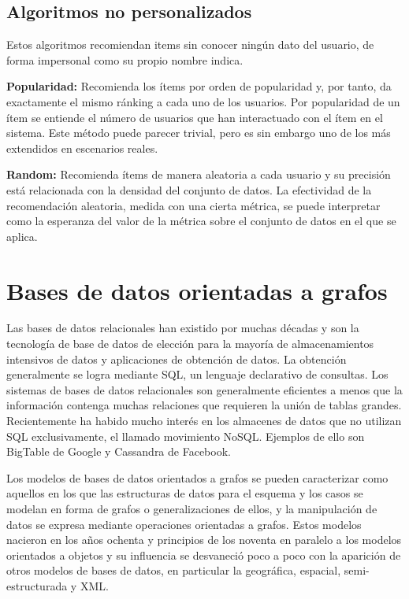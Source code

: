 		\subsection{Algoritmos no personalizados}
		Estos algoritmos recomiendan items sin conocer ningún dato del usuario, de forma impersonal como su propio nombre indica. 

		\textbf{Popularidad:} Recomienda los ítems por orden de popularidad y, por tanto, da exactamente el mismo ránking a cada uno de los usuarios. Por popularidad de un ítem se entiende el número de usuarios que han interactuado con el ítem en el sistema. Este método puede parecer trivial, pero es sin embargo uno de los más extendidos en escenarios reales.

		\textbf{Random:} Recomienda ítems de manera aleatoria a cada usuario y su precisión está relacionada con la densidad del conjunto de datos. La efectividad de la recomendación aleatoria, medida con una cierta métrica, se puede interpretar como la esperanza del valor de la métrica sobre el conjunto de datos en el que se aplica. \cite{11}

 \section{Bases de datos orientadas a grafos}
	Las bases de datos relacionales han existido por muchas décadas y son la tecnología de base de datos de elección para la mayoría de almacenamientos intensivos de datos y aplicaciones de obtención de datos. La obtención generalmente se logra mediante SQL, un lenguaje declarativo de consultas. Los sistemas de bases de datos relacionales son generalmente eficientes a menos que la información contenga muchas relaciones que requieren la unión de tablas grandes. Recientemente ha habido mucho interés en los almacenes de datos que no utilizan SQL exclusivamente, el llamado movimiento NoSQL. Ejemplos de ello son BigTable de Google y Cassandra de Facebook. \cite{7}

	Los modelos de bases de datos orientados a grafos se pueden caracterizar como aquellos en los que las estructuras de datos para el esquema y los casos se modelan en forma de grafos o generalizaciones de ellos, y la manipulación de datos se expresa mediante operaciones orientadas a grafos. Estos modelos nacieron en los años ochenta y principios de los noventa en paralelo a los modelos orientados a objetos y su influencia se desvaneció poco a poco con la aparición de otros modelos de bases de datos, en particular la geográfica, espacial, semi-estructurada y XML.

